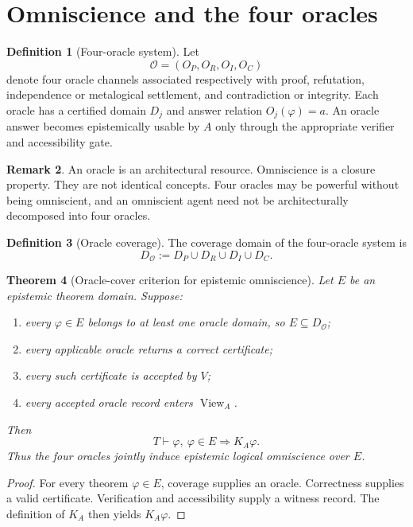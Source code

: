 \documentclass[11pt]{article}
\theoremstyle{definition}
\newtheorem{definition}{Definition}[section]
\newtheorem{remark}[definition]{Remark}
\theoremstyle{plain}
\newtheorem{theorem}[definition]{Theorem}
\newcommand{\View}{\operatorname{View}}
\begin{document}
\section{Omniscience and the four oracles}

\begin{definition}[Four-oracle system]
Let
\[
\mathcal O=(O_P,O_R,O_I,O_C)
\]
denote four oracle channels associated respectively with proof, refutation, independence or metalogical settlement, and contradiction or integrity. Each oracle has a certified domain $D_j$ and answer relation $O_j(\varphi)=a$. An oracle answer becomes epistemically usable by $A$ only through the appropriate verifier and accessibility gate.
\end{definition}

\begin{remark}
An oracle is an architectural resource. Omniscience is a closure property. They are not identical concepts. Four oracles may be powerful without being omniscient, and an omniscient agent need not be architecturally decomposed into four oracles.
\end{remark}

\begin{definition}[Oracle coverage]
The coverage domain of the four-oracle system is
\[
D_{\mathcal O}:=D_P\cup D_R\cup D_I\cup D_C.
\]
\end{definition}

\begin{theorem}[Oracle-cover criterion for epistemic omniscience]
Let $E$ be an epistemic theorem domain. Suppose:
\begin{enumerate}[label=(\arabic*)]
\item every $\varphi\in E$ belongs to at least one oracle domain, so $E\subseteq D_{\mathcal O}$;
\item every applicable oracle returns a correct certificate;
\item every such certificate is accepted by $V$;
\item every accepted oracle record enters $\View_A$.
\end{enumerate}
Then
\[
T\vdash\varphi,\ \varphi\in E\Longrightarrow K_A\varphi.
\]
Thus the four oracles jointly induce epistemic logical omniscience over $E$.
\end{theorem}

\begin{proof}
For every theorem $\varphi\in E$, coverage supplies an oracle. Correctness supplies a valid certificate. Verification and accessibility supply a witness record. The definition of $K_A$ then yields $K_A\varphi$.
\end{proof}
\end{document}
